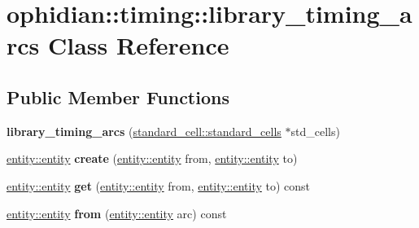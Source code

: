 \hypertarget{classophidian_1_1timing_1_1library__timing__arcs}{\section{ophidian\-:\-:timing\-:\-:library\-\_\-timing\-\_\-arcs Class Reference}
\label{classophidian_1_1timing_1_1library__timing__arcs}
}
\subsection*{Public Member Functions}
\begin{DoxyCompactItemize}
\item 
\hypertarget{classophidian_1_1timing_1_1library__timing__arcs_a132a07658041f3c137bfd932a74e9a4f}{{\bfseries library\-\_\-timing\-\_\-arcs} (\hyperlink{classophidian_1_1standard__cell_1_1standard__cells}{standard\-\_\-cell\-::standard\-\_\-cells} $\ast$std\-\_\-cells)}\label{classophidian_1_1timing_1_1library__timing__arcs_a132a07658041f3c137bfd932a74e9a4f}

\item 
\hypertarget{classophidian_1_1timing_1_1library__timing__arcs_a48e498925cc2902e31b66303cbb088b5}{\hyperlink{classophidian_1_1entity_1_1entity}{entity\-::entity} {\bfseries create} (\hyperlink{classophidian_1_1entity_1_1entity}{entity\-::entity} from, \hyperlink{classophidian_1_1entity_1_1entity}{entity\-::entity} to)}\label{classophidian_1_1timing_1_1library__timing__arcs_a48e498925cc2902e31b66303cbb088b5}

\item 
\hypertarget{classophidian_1_1timing_1_1library__timing__arcs_a525d20d2692399710b5f8b16cece1017}{\hyperlink{classophidian_1_1entity_1_1entity}{entity\-::entity} {\bfseries get} (\hyperlink{classophidian_1_1entity_1_1entity}{entity\-::entity} from, \hyperlink{classophidian_1_1entity_1_1entity}{entity\-::entity} to) const }\label{classophidian_1_1timing_1_1library__timing__arcs_a525d20d2692399710b5f8b16cece1017}

\item 
\hypertarget{classophidian_1_1timing_1_1library__timing__arcs_a5bac3c498ab27a23b070da2383de19b1}{\hyperlink{classophidian_1_1entity_1_1entity}{entity\-::entity} {\bfseries from} (\hyperlink{classophidian_1_1entity_1_1entity}{entity\-::entity} arc) const }\label{classophidian_1_1timing_1_1library__timing__arcs_a5bac3c498ab27a23b070da2383de19b1}


\end{DoxyCompactItemize}

